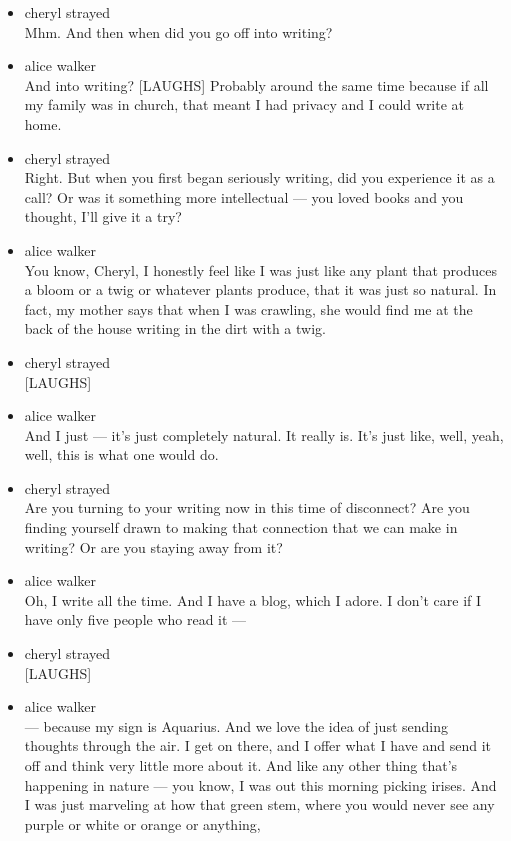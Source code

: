 \begin{itemize}
\item
  cheryl strayed\\
  Mhm. And then when did you go off into writing?
\item
  alice walker\\
  And into writing? {[}LAUGHS{]} Probably around the same time because
  if all my family was in church, that meant I had privacy and I could
  write at home.
\item
  cheryl strayed\\
  Right. But when you first began seriously writing, did you experience
  it as a call? Or was it something more intellectual --- you loved
  books and you thought, I'll give it a try?
\item
  alice walker\\
  You know, Cheryl, I honestly feel like I was just like any plant that
  produces a bloom or a twig or whatever plants produce, that it was
  just so natural. In fact, my mother says that when I was crawling, she
  would find me at the back of the house writing in the dirt with a
  twig.
\item
  cheryl strayed\\
  {[}LAUGHS{]}
\item
  alice walker\\
  And I just --- it's just completely natural. It really is. It's just
  like, well, yeah, well, this is what one would do.
\item
  cheryl strayed\\
  Are you turning to your writing now in this time of disconnect? Are
  you finding yourself drawn to making that connection that we can make
  in writing? Or are you staying away from it?
\item
  alice walker\\
  Oh, I write all the time. And I have a blog, which I adore. I don't
  care if I have only five people who read it ---
\item
  cheryl strayed\\
  {[}LAUGHS{]}
\item
  alice walker\\
  --- because my sign is Aquarius. And we love the idea of just sending
  thoughts through the air. I get on there, and I offer what I have and
  send it off and think very little more about it. And like any other
  thing that's happening in nature --- you know, I was out this morning
  picking irises. And I was just marveling at how that green stem, where
  you would never see any purple or white or orange or anything,

\end{itemize}
